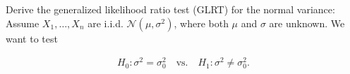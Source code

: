 
\begin{exercise}

Derive the generalized likelihood ratio test (GLRT) for the normal variance:
Assume $X_1,\dots,X_n$ are i.i.d. $\mathcal{N}(\mu,\sigma^2)$, where both $\mu$ and $\sigma$
are unknown. We want to test

\begin{align*}
  H_0: \sigma^2 = \sigma_0^2 \quad \text{vs.} \quad H_1: \sigma^2 \neq \sigma_0^2.
\end{align*}

\end{exercise}


